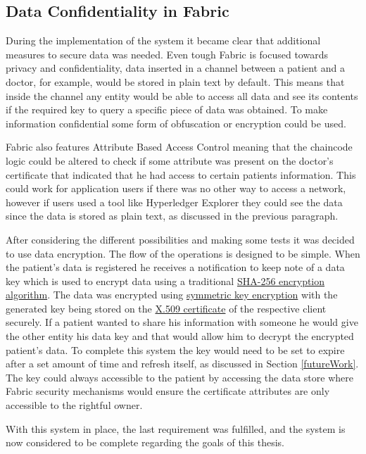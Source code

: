 \subsection{Data Confidentiality in Fabric}

During the implementation of the system it became clear that additional
measures to secure data was needed. Even tough Fabric is focused towards
privacy and confidentiality, data inserted in a channel between a patient and a
doctor, for example, would be stored in plain text by default. This means that
inside the channel any entity would be able to access all data and see its
contents if the required key to query a specific piece of data was obtained.
To make information confidential some form of obfuscation or encryption could
be used. 

Fabric also features Attribute Based Access Control meaning that the chaincode
logic could be altered to check if some attribute was present on the doctor's
certificate that indicated that he had access to certain patients information.
This could work for application users if there was no other way to access a
network, however if users used a tool like Hyperledger Explorer they could see
the data since the data is stored as plain text, as discussed in the previous
paragraph.

After considering the different possibilities and making some tests it was
decided to use data encryption. The flow of the operations is designed to be
simple. When the patient's data is registered he receives a notification to
keep note of a data key which is used to encrypt data using a traditional
\href{https://en.wikipedia.org/wiki/SHA-2}{SHA-256 encryption algorithm}. The
data was encrypted using
\href{https://www.ibm.com/support/knowledgecenter/en/SSB23S_1.1.0.14/gtps7/s7symm.html}{symmetric
key encryption} with the generated key being stored on the
\href{https://en.wikipedia.org/wiki/X.509}{X.509 certificate} of the respective
client securely. If a patient wanted to share his information with someone he
would give the other entity his data key and that would allow him to decrypt
the encrypted patient's data. To complete this system the key would need to be
set to expire after a set amount of time and refresh itself, as discussed in
Section \ref{futureWork}. The key could always accessible to the patient by
accessing the data store where Fabric security mechanisms would ensure the
certificate attributes are only accessible to the rightful owner.

With this system in place, the last requirement was fulfilled, and the system
is now considered to be complete regarding the goals of this thesis.
